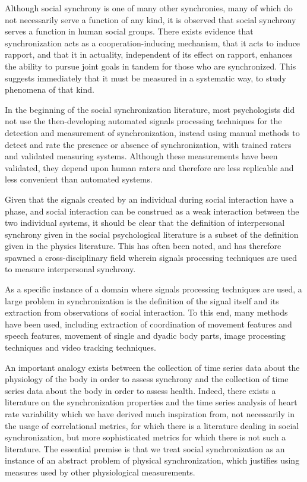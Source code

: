\documentclass[12pt]{article}
\begin{document}
Although social synchrony is one of many other synchronies, many of which do not necessarily serve a function of any kind, it is observed that social synchrony serves a function in human social groups. There exists evidence that synchronization acts as a cooperation-inducing mechanism\cite{coop}, that it acts to induce rapport\cite{rapport}, and that it in actuality, independent of its effect on rapport, enhances the ability to pursue joint goals in tandem for those who are synchronized\cite{goals}. This suggests immediately that it must be measured in a systematic way, to study phenomena of that kind.

In the beginning of the social synchronization literature, most psychologists did not use the then-developing automated signals processing techniques for the detection and measurement of synchronization, instead using manual methods to detect and rate the presence or absence of synchronization, with trained raters and validated measuring systems\cite{manual}. Although these measurements have been validated\cite{manualval}, they depend upon human raters and therefore are less replicable and less convenient than automated systems.

Given that the signals created by an individual during social interaction have a phase, and social interaction can be construed as a weak interaction between the two individual systems, it should be clear that the definition of interpersonal synchrony given in the social psychological literature is a subset of the definition given in the physics literature. This has often been noted\cite{socialsync}, and has therefore spawned a cross-disciplinary field wherein signals processing techniques are used to measure interpersonal synchrony.

As a specific instance of a domain where signals processing techniques are used, a large problem in synchronization is the definition of the signal itself and its extraction from observations of social interaction. To this end, many methods have been used, including extraction of coordination of movement features and speech features, movement of single and dyadic body parts, image processing techniques and video tracking techniques. %

An important analogy exists between the collection of time series data about the physiology of the body in order to assess synchrony and the collection of time series data about the body in order to assess health. Indeed, there exists a literature on the synchronization properties and the time series analysis of heart rate variability which we have derived much inspiration from, not necessarily in the usage of correlational metrics, for which there is a literature dealing in social synchronization, but more sophisticated metrics for which there is not such a literature\cite{hrv1}\cite{hrv2}. The essential premise is that we treat social synchronization as an instance of an abstract problem of physical synchronization, which justifies using measures used by other physiological measurements.
\end{document}
